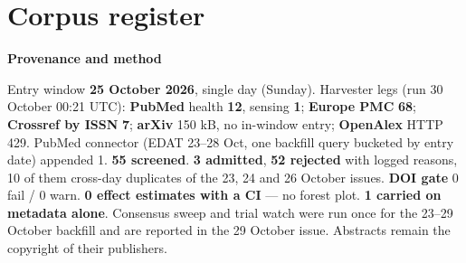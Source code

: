 \documentclass[10pt]{article}
\begin{document}
\clearpage
\section*{\sffamily\bfseries\color{Deep}Corpus register}
\vspace{-1.5mm}{\color{Amber}\rule{\linewidth}{1.1pt}}\vspace{2.5mm}



\vspace{2mm}

\begin{keybox}
{\sffamily\bfseries\footnotesize\color{Deep}Provenance and method}\\[1.2mm]
{\fontsize{7.2}{8.8}\selectfont
Entry window \textbf{25 October 2026}, single day (Sunday). Harvester legs (run 30 October 00:21 UTC):
\textbf{PubMed} health \textbf{12}, sensing \textbf{1}; \textbf{Europe PMC} \textbf{68}; \textbf{Crossref by ISSN}
\textbf{7}; \textbf{arXiv} 150 kB, no in-window entry; \textbf{OpenAlex} HTTP 429. PubMed connector (EDAT 23--28 Oct,
one backfill query bucketed by entry date) appended 1. \textbf{55 screened}. \textbf{3 admitted}, \textbf{52
rejected} with logged reasons, 10 of them cross-day duplicates of the 23, 24 and 26 October issues. \textbf{DOI gate}
0 fail / 0 warn. \textbf{0 effect estimates with a CI} --- no forest plot. \textbf{1 carried on metadata alone}.
Consensus sweep and trial watch were run once for the 23--29 October backfill and are reported in the 29 October
issue. Abstracts remain the copyright of their publishers.\par}
\end{keybox}
\end{document}
